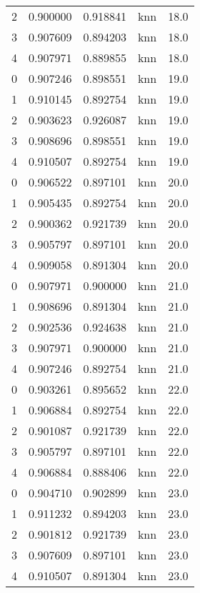 \begin{tabular}{rrrlr}
     2 & 0.900000 & 0.918841 &      knn &       18.0 \\
     3 & 0.907609 & 0.894203 &      knn &       18.0 \\
     4 & 0.907971 & 0.889855 &      knn &       18.0 \\
     0 & 0.907246 & 0.898551 &      knn &       19.0 \\
     1 & 0.910145 & 0.892754 &      knn &       19.0 \\
     2 & 0.903623 & 0.926087 &      knn &       19.0 \\
     3 & 0.908696 & 0.898551 &      knn &       19.0 \\
     4 & 0.910507 & 0.892754 &      knn &       19.0 \\
     0 & 0.906522 & 0.897101 &      knn &       20.0 \\
     1 & 0.905435 & 0.892754 &      knn &       20.0 \\
     2 & 0.900362 & 0.921739 &      knn &       20.0 \\
     3 & 0.905797 & 0.897101 &      knn &       20.0 \\
     4 & 0.909058 & 0.891304 &      knn &       20.0 \\
     0 & 0.907971 & 0.900000 &      knn &       21.0 \\
     1 & 0.908696 & 0.891304 &      knn &       21.0 \\
     2 & 0.902536 & 0.924638 &      knn &       21.0 \\
     3 & 0.907971 & 0.900000 &      knn &       21.0 \\
     4 & 0.907246 & 0.892754 &      knn &       21.0 \\
     0 & 0.903261 & 0.895652 &      knn &       22.0 \\
     1 & 0.906884 & 0.892754 &      knn &       22.0 \\
     2 & 0.901087 & 0.921739 &      knn &       22.0 \\
     3 & 0.905797 & 0.897101 &      knn &       22.0 \\
     4 & 0.906884 & 0.888406 &      knn &       22.0 \\
     0 & 0.904710 & 0.902899 &      knn &       23.0 \\
     1 & 0.911232 & 0.894203 &      knn &       23.0 \\
     2 & 0.901812 & 0.921739 &      knn &       23.0 \\
     3 & 0.907609 & 0.897101 &      knn &       23.0 \\
     4 & 0.910507 & 0.891304 &      knn &       23.0 \\

\end{tabular}
